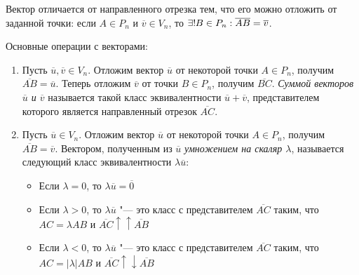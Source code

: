 \begin{note}
	Вектор отличается от направленного отрезка тем, что его можно отложить от заданной точки: если $A \in P_n$ и $\overline v \in V_n$, то $\operatorname{\exists!\hspace{-2pt}} B \in P_n: \overline{AB} = \overline{v}$.
\end{note}

\begin{definition}
	Основные операции с векторами:
	\begin{enumerate}
		\item Пусть $\overline u, \overline v \in V_n$. Отложим вектор $\overline{u}$ от некоторой точки $A \in P_n$, получим $\overline{AB} = \overline{u}$. Теперь отложим $\overline{v}$ от точки $B \in P_n$, получим $\overline{BC}$. \textit{Суммой векторов $\overline{u}$ и $\overline{v}$} называется такой класс эквивалентности $\overline{u} + \overline{v}$, представителем которого является направленный отрезок $\overline{AC}$.
		
		\item Пусть $\overline u \in V_n$. Отложим вектор $\overline{u}$ от некоторой точки $A \in P_n$, получим $\overline{AB} = \overline{v}$. Вектором, полученным из $\overline u$ \textit{умножением на скаляр $\lambda$}, называется следующий класс эквивалентности $\lambda \overline{u}$:
		\begin{itemize}
			\item Если $\lambda = 0$, то $\lambda \overline{u} = \overline{0}$
			\item Если $\lambda > 0$, то $\lambda \overline{u}$ "--- это класс с представителем $\overline{AC}$ таким, что $AC = \lambda AB$ и $\overline{AC} \uparrow\uparrow \overline{AB}$
			\item Если $\lambda < 0$, то $\lambda \overline{u}$ "--- это класс с представителем $\overline{AC}$ таким, что $AC = |\lambda| AB$ и $\overline{AC} \uparrow\downarrow \overline{AB}$
		\end{itemize}
	\end{enumerate}
\end{definition}

